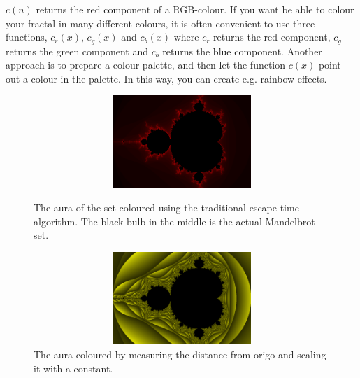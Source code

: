 \documentclass{article}
\begin{document}
$c(n)$ returns the red component of a RGB-colour. If you want be able to colour your fractal in many different colours, it is often convenient to use three functions, $c_{r}(x)$, $c_{g}(x)$ and $c_{b}(x)$ where $c_{r}$ returns the red component, $c_{g}$ returns the green component and $c_{b}$ returns the blue component. Another approach is to prepare a colour palette, and then let the function $c(x)$ point out a colour in the palette. In this way, you can create e.g. rainbow effects.

\begin{figure}
\centering
\begin{minipage}[ht]{.45\textwidth}
\centering
\includegraphics[width=1.0\textwidth,height=3.5cm]{mandelbrot.png}
\caption{The aura of the set coloured using the traditional escape time algorithm. The black bulb in the middle is the actual Mandelbrot set.}
\end{minipage}\hfill
\begin{minipage}[ht]{.45\textwidth}
\centering
\includegraphics[width=1.0\textwidth,height=3.5cm]{abs.png}
\caption{The aura coloured by measuring the distance from origo and scaling it with a constant.\\\\}
\end{minipage}
\end{figure}
\end{document}
